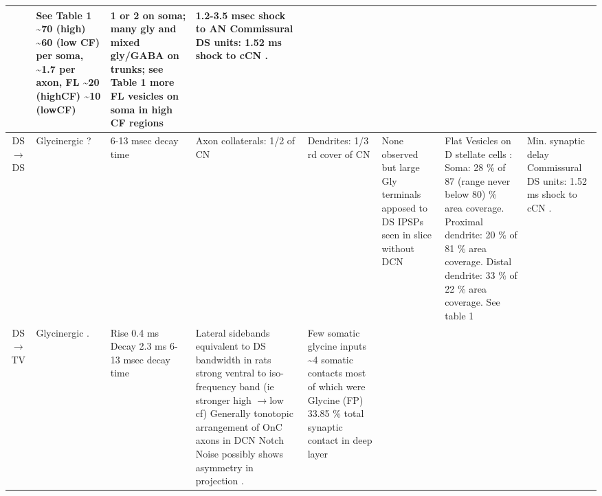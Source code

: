 \begin{longtable}{cYYYYYYY}
& %
\citep[mice][]{FerragamoGoldingEtAl:1998a} 
See Table 1 \citep[cat][]{SmithRhode:1989} 
 \~{}70 (high) \~{}60 (low CF) per soma, 
\~{}1.7 per axon, FL \~{}20 (highCF)
\~{}10 (lowCF) \citep[chinchilla][]{JosephsonMorest:1998}                
& %
1 or 2 on soma; many gly and mixed gly/GABA on trunks; see Table 1\citep{SmithRhode:1989} 
more FL vesicles on soma in high CF regions \citep{JosephsonMorest:1998}      
& 
1.2-3.5 msec shock to AN \citep{FerragamoGoldingEtAl:1998a,NeedhamPaolini:2003,Oertel:1983}
Commissural DS units: 1.52 ms shock to cCN \citep{NeedhamPaolini:2006}.
\\ \midrule
DS\ensuremath{\rightarrow}DS                        
& %
Glycinergic                   \citep{FerragamoGoldingEtAl:1998a}?                    
& %
6-13 msec decay time \citep{AwatramaniTurecekEtAl:2005,HartyManis:1996,HartyManis:1998,LeaoOleskevichEtAl:2004}
& %
Axon collaterals: 1/2 of CN
& %
Dendrites: 1/3 rd cover of CN
& %
None observed but large Gly terminals apposed to DS \citep[cat][]{SmithRhode:1989} 
IPSPs seen in slice without DCN \citep{FerragamoGoldingEtAl:1998a}                     
&    
Flat Vesicles on D stellate cells \citep[cat][]{SmithRhode:1989}:
Soma: 28 \%  of 87 (range never below 80) \% area coverage. 
Proximal dendrite: 20 \%  of 81 \% area coverage.  
Distal dendrite: 33 \%  of 22 \% area coverage.   
See table 1 \citep{SmithRhode:1989}     
& 
Min. synaptic delay 
Commissural DS units: 1.52 ms shock to cCN \citep{NeedhamPaolini:2006}.
\\ \midrule
DS\ensuremath{\rightarrow}TV                        
& %
Glycinergic \citep{DoucetRyugoEtAl:1999,OertelWuEtAl:1990,OstapoffMorestEtAl1999,SpirouDavisEtAl:1999,ZhangOertel:1993}. 
& 
Rise 0.4 ms Decay 2.3 ms \citep{AwatramaniTurecekEtAl:2005}
6-13 msec decay time \citep{FerragamoGoldingEtAl:1998a,HartyManis:1996,HartyManis:1998,LeaoOleskevichEtAl:2004}
& 
Lateral sidebands equivalent to DS bandwidth
\citep{OstapoffMorestEtAl:1999,SpirouDavisEtAl:1999} 
in rats strong ventral to iso-frequency band (ie stronger high \ensuremath{\rightarrow}low cf)
\citep{DoucetRyugoEtAl:1999,FriedlandPongstapornEtAl:2003} 
Generally tonotopic arrangement of OnC axons in DCN \citep{ArnottWallaceEtAl:2004}
Notch Noise possibly shows asymmetry in projection \citep{ReissYoung:2005}.      
& 
Few somatic glycine inputs 
\citep{OsenOttersenEtAl:1990,OstapoffMorestEtAl1999:1999,ZhangOertel:1993}
\~{}4 somatic contacts most of which were Glycine (FP) \citep{Alibardi:1999}
33.85 \% total synaptic contact in deep layer \citep[rat][]{RubioJuiz:2004}

\end{longtable}
